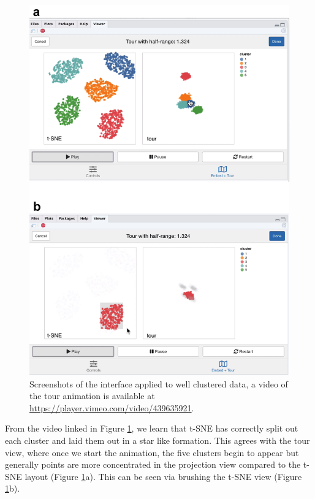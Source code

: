 \documentclass[article,notitle]{jdssv}
\begin{document}
\begin{figure}

{\centering \includegraphics[width=\textwidth,height=0.75\textheight]{./img/liminal-screenshot-gaussian} 

}

\caption{Screenshots of the  interface applied to well clustered data, a video of the tour animation is available at \url{https://player.vimeo.com/video/439635921}.}\label{fig:gaussian}
\end{figure}

From the video linked in Figure \ref{fig:gaussian}, we learn that t-SNE has
correctly split out each cluster and laid them out in a star like formation.
This agrees with the tour view,
where once we start the animation, the five clusters begin to appear but
generally points are more concentrated in the projection view compared to
the t-SNE layout (Figure \ref{fig:gaussian}a).
This can be seen via brushing the t-SNE view (Figure \ref{fig:gaussian}b).
\end{document}
